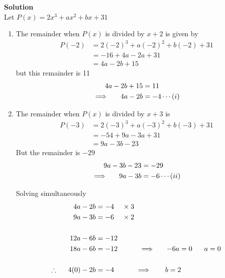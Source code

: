 \documentclass[11pt,a4paper]{article}
\begin{document}
\textbf{Solution}\\
Let $P(x)=2x^3+ax^2+bx+31$
\begin{enumerate}
\item The remainder when $P(x)$ is divided by $x+2$ is given by
\begin{align*}
P(-2) & = 2(-2)^3+a(-2)^2+b(-2)+31\\
      & = -16+4a-2a+31\\
      & = 4a-2b+15
\end{align*}
but this remainder is 11
\begin{align*}
4a-2b+15 & = 11\\
\implies \hspace{0.5cm} 4a-2b & = -4\cdots (i)
\end{align*}

\item The remainder when $P(x)$ is divided by $x+3$ is
\begin{align*}
P(-3) & = 2(-3)^3+a(-3)^2+b(-3)+31\\
      & = -54+9a-3a+31\\
      & = 9a-3b-23
\end{align*}
But the remainder is $-29$
\begin{align*}
9a-3b-23 & = -29\\
\implies \hspace{0.5cm} 9a-3b & = -6\cdots (ii)\\
\end{align*}

Solving simultaneously
\begin{align*}
4a-2b & = -4\hspace{0.4cm}\times 3\\
9a-3b & = -6\hspace{0.4cm}\times 2\\\\
12a-6b & = -12\\
18a-6b & = -12 \hspace{1cm} \implies \hspace{0.5cm} -6a=0\hspace{0.6cm} a=0\\\\
\therefore\hspace{0.5cm} 4(0)-2b & =-4\hspace{1cm} \implies \hspace{0.6cm} b=2\\
\end{align*}
\end{enumerate}
\end{document}
